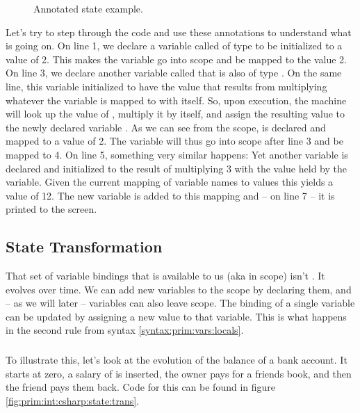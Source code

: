 \begin{figure}[tbp]
  
  \caption{Annotated state example.}
  \label{fig:prim:int:csharp:state}
\end{figure}

Let's try to step through the code and use these annotations to understand what is going on. On line 1, we declare a variable called  of type  to be initialized to a value of 2. This makes the  variable go into scope and be mapped to the value 2. On line 3, we declare another variable called  that is also of type . On the same line, this variable initialized to have the value that results from multiplying whatever the  variable is mapped to with itself. So, upon execution, the machine will look up the value of , multiply it by itself, and assign the resulting value to the newly declared variable . As we can see from the scope,  is declared and mapped to a value of 2. The  variable will thus go into scope after line 3 and be mapped to 4. On line 5, something very similar happens: Yet another variable is declared and initialized to the result of multiplying 3 with the value held by the  variable. Given the current mapping of variable names to values this yields a value of 12. The new variable is added to this mapping and -- on line 7 -- it is printed to the screen.

\subsection{State Transformation}

That set of variable bindings that is available to us (aka in scope) isn't . It evolves over time. We can add new variables to the scope by declaring them, and -- as we will later -- variables can also leave scope. The binding of a single variable can be updated by assigning a new value to that variable. This is what happens in the second  rule from syntax \ref{syntax:prim:vars:locals}.

\subsubsection{\csharp}

To illustrate this, let's look at the evolution of the balance of a bank account. It starts at zero, a salary of is inserted, the owner pays for a friends book, and then the friend pays them back. Code for this can be found in figure \ref{fig:prim:int:csharp:state:trans}.

